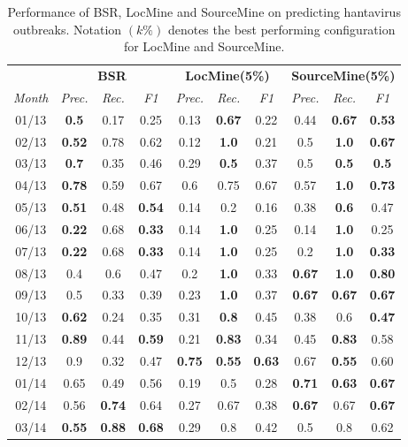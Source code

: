 \documentclass[conference]{IEEEtran}
\newcommand{\fullmodel}{{{\sf SourceMine}}\xspace}
\newcommand{\locationmodel}{{\sf LocMine}\xspace}
\begin{document}
\begin{table}[h]
\scriptsize \centering
  \caption{Performance of BSR, \locationmodel and \fullmodel on predicting hantavirus outbreaks. Notation $(k\% )$ denotes the best performing configuration for \locationmodel and \fullmodel. }
  \begin{tabular}{|c|c|c|c|c|c|c|c|c|c|}
    \hline
    & \multicolumn{3}{c|}{{\bf BSR}} &
    \multicolumn{3}{c|}{{\bf \locationmodel(5\%)}} &
    \multicolumn{3}{c|}{{\bf \fullmodel(5\%)}} \\
    \cline{2-10} {\em Month}   & {\em Prec.} & {\em Rec.} & {\em F1} & {\em Prec.} & {\em Rec.} & {\em F1} & {\em Prec.} & {\em Rec.} & {\em F1} \\
    \hline 
    01/13 & {\bf 0.5} & 0.17 & 0.25 & 0.13 & {\bf 0.67} & 0.22 & 0.44 & {\bf 0.67} & {\bf 0.53}\\ 
    \hline
     02/13 & {\bf 0.52} & 0.78 & 0.62 & 0.12 & {\bf 1.0} & 0.21 & 0.5 & {\bf 1.0} & {\bf 0.67}\\ 
    \hline
    03/13 & {\bf 0.7} & 0.35 & 0.46 & 0.29 & {\bf 0.5} & 0.37 & 0.5 & {\bf 0.5} & {\bf 0.5}\\ 
    \hline
    04/13 & {\bf 0.78} & 0.59 & 0.67 & 0.6 & 0.75 & 0.67 & 0.57 & {\bf 1.0} & {\bf 0.73}\\ 
    \hline
    05/13 & {\bf 0.51} & 0.48 & {\bf 0.54} & 0.14 & 0.2 & 0.16 & 0.38 & {\bf 0.6} & 0.47\\ 
    \hline
    06/13 & {\bf 0.22} & 0.68 & {\bf 0.33} & 0.14 & {\bf 1.0} & 0.25 & 0.14 & {\bf 1.0} & 0.25\\ 
    \hline
    07/13 & {\bf 0.22} & 0.68 & {\bf 0.33} & 0.14 & {\bf 1.0} & 0.25 & 0.2 & {\bf 1.0} & {\bf 0.33}\\ 
    \hline
    08/13 & 0.4 & 0.6 & 0.47 & 0.2 & {\bf 1.0} & 0.33 & {\bf 0.67} & {\bf 1.0} & {\bf 0.80}\\ 
    \hline
    09/13 & 0.5 & 0.33 & 0.39 & 0.23 & {\bf 1.0} & 0.37 & {\bf 0.67} & {\bf 0.67} & {\bf 0.67}\\ 
    \hline
    10/13 & {\bf 0.62} & 0.24 & 0.35 & 0.31 & {\bf 0.8} & 0.45 & 0.38 & 0.6 & {\bf 0.47}\\ 
    \hline
    11/13 & {\bf 0.89} & 0.44 & {\bf 0.59} & 0.21 & {\bf 0.83} & 0.34 & 0.45 & {\bf 0.83} & 0.58\\ 
    \hline
    12/13 & 0.9 & 0.32 & 0.47 & {\bf 0.75} & {\bf 0.55} & {\bf 0.63} & 0.67 & {\bf 0.55} & 0.60\\ 
    \hline
    01/14 & 0.65 & 0.49 & 0.56 & 0.19 & 0.5 & 0.28 &  {\bf 0.71}& {\bf 0.63} & {\bf 0.67}\\ 
    \hline
    02/14 & 0.56 & {\bf 0.74} & 0.64 & 0.27 &  0.67 & 0.38 & {\bf 0.67} & 0.67 & {\bf 0.67}\\ 
    \hline
    03/14 & {\bf 0.55} & {\bf 0.88} & {\bf 0.68} & 0.29 & 0.8 & 0.42 & 0.5 & 0.8 & 0.62 \\ 
    \hline

  \end{tabular}
  \label{tab:results}
\end{table}
\end{document}
